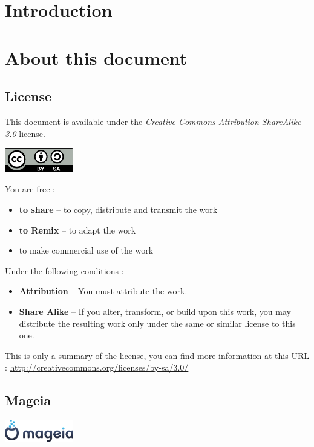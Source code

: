 \documentclass[a4paper,12pt]{article}
\begin{document}
\tableofcontents
\cleardoublepage

\section{Introduction}

\cleardoublepage
\section{About this document}
\subsection{License}

This document is available under the \emph{Creative Commons
Attribution-ShareAlike 3.0} license. 

\hfill \includegraphics[width=3cm]{by-sa.png}

You are free :
\begin{itemize}
\item \textbf{to share} -- to copy, distribute and transmit the work
\item \textbf{to Remix} -- to adapt the work
\item to make commercial use of the work
\end{itemize}

Under the following conditions :
\begin{itemize}
\item \textbf{Attribution} -- You must attribute the work.
\item \textbf{Share Alike} -- If you alter, transform, or build upon
      this work, you may distribute the resulting work only under the same or
      similar license to this one.
\end{itemize}

This is only a summary of the license, you can find more information at
this URL :
\url{http://creativecommons.org/licenses/by-sa/3.0/}

\subsection{Mageia}
\hfill \includegraphics[width=3cm]{mageia-logo.png}
\end{document}
